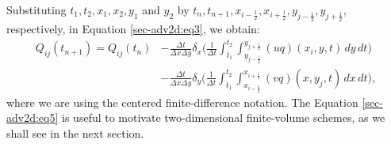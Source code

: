 Substituting $t_1, t_2, x_1, x_2, y_1$ and $y_2$ by 
$t_{n}, t_{n+1}, x_{i-\frac{1}{2}}, x_{i+\frac{1}{2}}, y_{j-\frac{1}{2}}, y_{j+\frac{1}{2}}$,
respectively, in Equation \eqref{sec-adv2d:eq3}, we obtain:
\begin{align}
	\label{sec-adv2d:eq5}
	{Q}_{ij}(t_{n+1})  = {Q}_{ij}(t_{n})
	&- \frac{\Delta t}{\Delta x \Delta y}
	\delta _x \bigg( \frac{1}{\Delta t}
	\int_{t_1}^{t_2} \int_{y_{j-\frac{1}{2}}}^{y_{j+\frac{1}{2}}} 
	{(uq)}(x_{i}, y, t)
	\,dy \,dt \bigg) \\ \nonumber
	&- \frac{\Delta t}{\Delta x \Delta y}
	\delta _y \bigg( \frac{1}{\Delta t}
	\int_{t_1}^{t_2} \int_{x_{i-\frac{1}{2}}}^{x_{i+\frac{1}{2}}} 
	{(vq)}(x, y_{j}, t)
	\,dx \,dt \bigg),
\end{align}
where we are using the centered finite-difference notation.
The Equation \eqref{sec-adv2d:eq5} is useful to
motivate two-dimensional finite-volume schemes, as we shall see in the next section.

